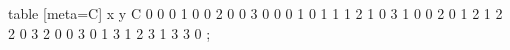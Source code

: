 table [meta=C] {
x y C
0 0 0
1 0 0
2 0 0
3 0 0
0 1 0
1 1 1
2 1 0
3 1 0
0 2 0
1 2 1
2 2 0
3 2 0
0 3 0
1 3 1
2 3 1
3 3 0
};
